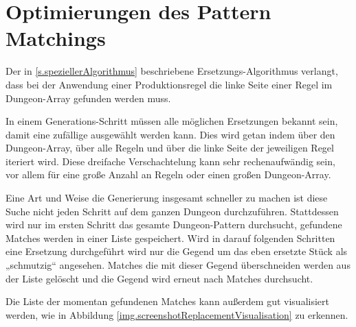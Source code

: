 \section{Optimierungen des Pattern Matchings}\label{s.optimierungen}

Der in \ref{s.speziellerAlgorithmus} beschriebene Ersetzungs-Algorithmus verlangt, dass bei der Anwendung einer Produktionsregel die linke Seite einer Regel im Dungeon-Array gefunden werden muss.

In einem Generations-Schritt müssen alle möglichen Ersetzungen bekannt sein, damit eine zufällige ausgewählt werden kann. Dies wird getan indem über den Dungeon-Array, über alle Regeln und über die linke Seite der jeweiligen Regel iteriert wird. Diese dreifache Verschachtelung kann sehr rechenaufwändig sein, vor allem für eine große Anzahl an Regeln oder einen großen Dungeon-Array. 






Eine Art und Weise die Generierung insgesamt schneller zu machen ist diese Suche nicht jeden Schritt auf dem ganzen Dungeon durchzuführen. Stattdessen wird nur im ersten Schritt das gesamte Dungeon-Pattern durchsucht, gefundene Matches werden in einer Liste gespeichert. Wird in darauf folgenden Schritten eine Ersetzung durchgeführt wird nur die Gegend um das eben ersetzte Stück als „schmutzig“ angesehen. Matches die mit dieser Gegend überschneiden werden aus der Liste gelöscht und die Gegend wird erneut nach Matches durchsucht. 

Die Liste der momentan gefundenen Matches kann außerdem gut visualisiert werden, wie in Abbildung \ref{img.screenshotReplacementVisualisation} zu erkennen.


